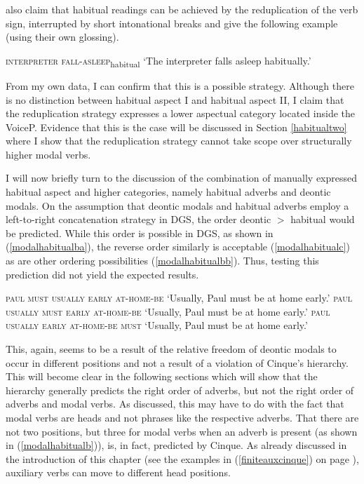 \noindent \citet[148]{happ2014vork} also claim that habitual readings can be achieved by the reduplication of the verb sign, interrupted by short intonational breaks and give the following example (using their own glossing). 

\begin{exe}
\ex \textsc{interpreter fall-asleep}\textsubscript{habitual} 
\glt `The interpreter falls asleep habitually.'\label{habitualhappvorkoeper}

\end{exe}

\noindent From my own data, I can confirm that this is a possible strategy. Although there is no distinction between habitual aspect I and habitual aspect II, I claim that the reduplication strategy expresses a lower aspectual category located inside the VoiceP. Evidence that this is the case will be discussed in Section \ref{habitualtwo} where I show that the reduplication strategy cannot take scope over structurally higher modal verbs.

I will now briefly turn to the discussion of the combination of manually expressed habitual aspect and higher categories, namely habitual adverbs and deontic modals. On the assumption that deontic modals and habitual adverbs employ a left-to-right concatenation strategy in DGS, the order deontic $>$ habitual would be predicted. While this order is possible in DGS, as shown in (\ref{modalhabitualba}), the reverse order similarly is acceptable (\ref{modalhabitualc}) as are other ordering possibilities (\ref{modalhabitualbb}). Thus, testing this prediction did not yield the expected results.

\begin{exe}
\ex\label{modalhabitualb}\begin{xlist} 
\ex \textsc{paul must usually early at-home-be}
\glt `Usually, Paul must be at home early.'\label{modalhabitualba}
\ex \textsc{paul usually must early at-home-be}
\glt `Usually, Paul must be at home early.'\label{modalhabitualc}
\ex \textsc{paul usually early at-home-be must}
\glt `Usually, Paul must be at home early.'\label{modalhabitualbb}


\end{xlist}
\end{exe} 


\noindent This, again, seems to be a result of the relative freedom of deontic modals to occur in different positions and not a result of a violation of Cinque's hierarchy. This will become clear in the following sections which will show that the hierarchy generally predicts the right order of adverbs, but not the right order of adverbs and modal verbs. As discussed, this may have to do with the fact that modal verbs are heads and not phrases like the respective adverbs. That there are not two positions, but three for modal verbs when an adverb is present (as shown in (\ref{modalhabitualb})), is, in fact, predicted by Cinque. As already discussed in the introduction of this chapter (see the examples in (\ref{finiteauxcinque}) on page \pageref{finiteauxcinque}), auxiliary verbs can move to different head positions.

